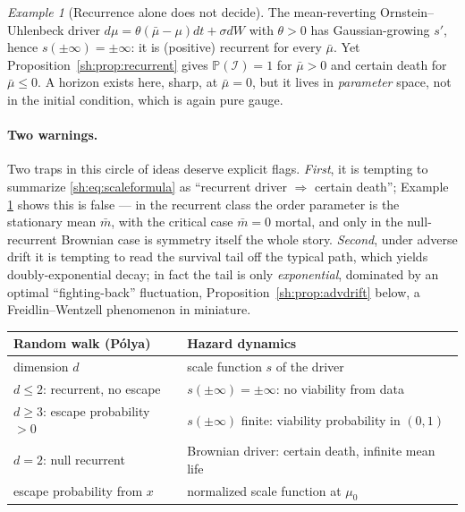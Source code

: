 \documentclass[11pt]{article}
\numberwithin{equation}{section}
\theoremstyle{plain}
\theoremstyle{definition}
\theoremstyle{remark}
\newtheorem{example}[theorem]{Example}
\newcommand{\PP}{\mathbb{P}}
\newcommand{\Imm}{\mathcal{I}}
\begin{document}
\begin{example}[Recurrence alone does not decide]\label{sh:ex:recurrentcounter}
The mean-reverting Ornstein--Uhlenbeck driver
$d\mu=\theta(\bar\mu-\mu)dt+\sigma dW$ with $\theta>0$ has Gaussian-growing
$s'$, hence $s(\pm\infty)=\pm\infty$: it is (positive) recurrent for every
$\bar\mu$. Yet Proposition~\ref{sh:prop:recurrent} gives
$\PP(\Imm)=1$ for $\bar\mu>0$ and certain death for $\bar\mu\le0$. A
horizon exists here, sharp, at $\bar\mu=0$, but it lives in
\emph{parameter} space, not in the initial condition, which is again pure
gauge.
\end{example}

\paragraph{Two warnings.}\label{sh:rem:warnings}
Two traps in this circle of ideas deserve explicit flags.
\emph{First}, it is tempting to summarize \eqref{sh:eq:scaleformula} as
``recurrent driver $\Rightarrow$ certain death''; Example
\ref{sh:ex:recurrentcounter} shows this is false --- in the recurrent class
the order parameter is the stationary mean $\bar m$, with the critical case
$\bar m=0$ mortal, and only in the null-recurrent Brownian case is
symmetry itself the whole story.
\emph{Second}, under adverse drift it is tempting to read the survival tail
off the typical path, which yields doubly-exponential decay; in fact the
tail is only \emph{exponential}, dominated by an optimal ``fighting-back''
fluctuation, Proposition~\ref{sh:prop:advdrift} below, a
Freidlin--Wentzell phenomenon in miniature.

\begin{center}
\begin{tabular}{@{}ll@{}}
\toprule
\textbf{Random walk (P\'olya)} & \textbf{Hazard dynamics}\\
\midrule
dimension $d$ & scale function $s$ of the driver\\
$d\le2$: recurrent, no escape & $s(\pm\infty)=\pm\infty$: no viability from
data\\
$d\ge3$: escape probability $>0$ & $s(\pm\infty)$ finite: viability
probability in $(0,1)$\\
$d=2$: null recurrent & Brownian driver: certain death, infinite mean
life\\
escape probability from $x$ & normalized scale function at $\mu_0$\\
\bottomrule
\end{tabular}
\end{center}
\end{document}
